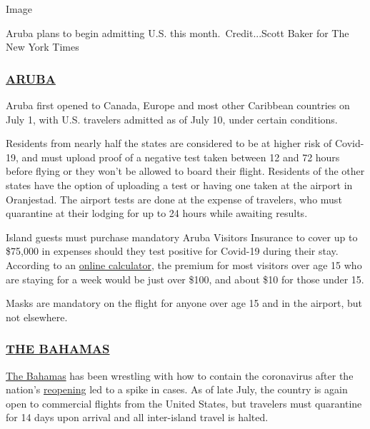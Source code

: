 Image

Aruba plans to begin admitting U.S. this month.~Credit...Scott Baker for
The New York Times

\hypertarget{aruba}{%
\subsubsection{\texorpdfstring{\href{https://www.aruba.com/us/traveler-health-requirements}{ARUBA}}{ARUBA}}\label{aruba}}

Aruba first opened to Canada, Europe and most other Caribbean countries
on July 1, with U.S. travelers admitted as of July 10, under certain
conditions.

Residents from nearly half the states are considered to be at higher
risk of Covid-19, and must upload proof of a negative test taken between
12 and 72 hours before flying or they won't be allowed to board their
flight. Residents of the other states have the option of uploading a
test or having one taken at the airport in Oranjestad. The airport tests
are done at the expense of travelers, who must quarantine at their
lodging for up to 24 hours while awaiting results.

Island guests must purchase mandatory Aruba Visitors Insurance to cover
up to \$75,000 in expenses should they test positive for Covid-19 during
their stay. According to an
\href{https://www.arubavisitorsinsurance.com/calculator}{online
calculator}, the premium for most visitors over age 15 who are staying
for a week would be just over \$100, and about \$10 for those under 15.

Masks are mandatory on the flight for anyone over age 15 and in the
airport, but not elsewhere.

\hypertarget{the-bahamas}{%
\subsubsection{\texorpdfstring{\href{https://opm.gov.bs/national-address/}{THE
BAHAMAS}}{THE BAHAMAS}}\label{the-bahamas}}

\href{https://www.bahamas.com/pressroom/bahamas-ministry-tourism-aviation-statement-executive-order-amid-rising-covid-19-cases}{The
Bahamas} has been wrestling with how to contain the coronavirus after
the nation's \href{https://www.bahamas.com/tourism-reopening}{reopening}
led to a spike in cases. As of late July, the country is again open to
commercial flights from the United States, but travelers must quarantine
for 14 days upon arrival and all inter-island travel is halted.


